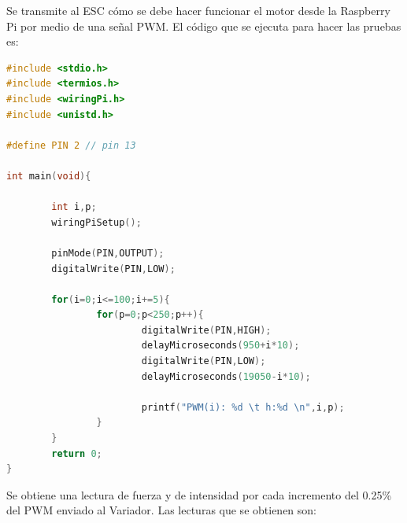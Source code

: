 \documentclass[twoside,11pt]{report}
\begin{document}




Se transmite al ESC cómo se debe hacer funcionar el motor desde la Raspberry Pi por medio de una señal PWM. El código que se ejecuta para hacer las pruebas es:
\singlespacing
\begin{lstlisting}[language=C]
#include <stdio.h>
#include <termios.h>
#include <wiringPi.h>
#include <unistd.h>

#define PIN 2 // pin 13

int main(void){

        int i,p;
        wiringPiSetup();

        pinMode(PIN,OUTPUT);
        digitalWrite(PIN,LOW);

        for(i=0;i<=100;i+=5){
                for(p=0;p<250;p++){
                        digitalWrite(PIN,HIGH);
                        delayMicroseconds(950+i*10);
                        digitalWrite(PIN,LOW);
                        delayMicroseconds(19050-i*10);

                        printf("PWM(i): %d \t h:%d \n",i,p);
                }
        }
        return 0;
}
\end{lstlisting}
\onehalfspacing 
Se obtiene una lectura de fuerza y  de intensidad por cada incremento del 0.25\% del PWM enviado al Variador. Las lecturas que se obtienen son: 
\end{document}
